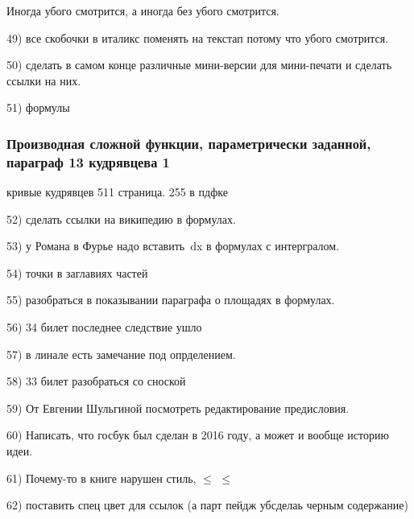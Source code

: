 Иногда убого смотрится, а иногда без \noindent убого смотрится.

49) все скобочки в италикс поменять на текстап потому что убого смотрится.

50) сделать в самом конце различные мини-версии для мини-печати и сделать ссылки на них.

51) формулы
\subsubsection{Производная сложной функции, параметрически заданной, параграф 13 кудрявцева 1}

кривые кудрявцев 511 страница. 255 в пдфке

52) сделать ссылки на википедию в формулах.

53) у Романа в Фурье надо вставить \,dx в формулах с интергралом.

54) точки в заглавиях частей

55) разобраться в показывании параграфа о площадях в формулах.

56) 34 билет последнее следствие ушло

57) в линале есть замечание под опрделением.

58) 33 билет разобраться со сноской

59) От Евгении Шульгиной посмотреть редактирование предисловия.

60) Написать, что госбук был сделан в 2016 году, а может и вообще историю идеи. 

61) Почему-то в книге нарушен стиль, $\le$ $\leq$

62) поставить спец цвет для ссылок (а парт пейдж убсделаь черным содержание)